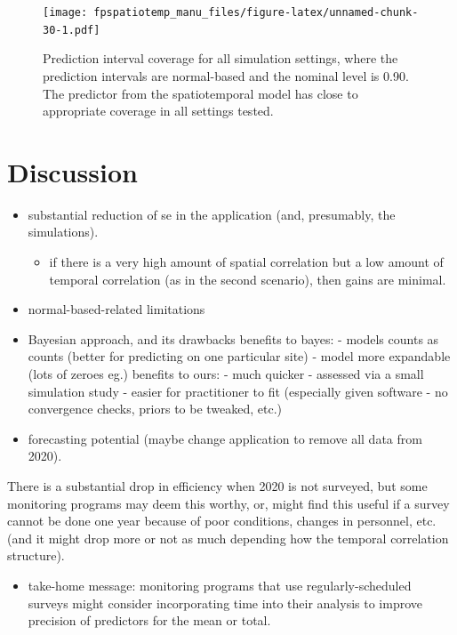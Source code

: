 \documentclass[]{interact}
\theoremstyle{plain}%
\theoremstyle{definition}
\theoremstyle{remark}
\providecommand{\tightlist}{%
  \setlength{\itemsep}{0pt}\setlength{\parskip}{0pt}}
\def\tightlist{}
\begin{document}
\begin{figure}
\centering
\texttt{[image: fpspatiotemp\_manu\_files/figure-latex/unnamed-chunk-30-1.pdf]}
\caption{\label{fig:pi} Prediction interval coverage for all simulation
settings, where the prediction intervals are normal-based and the
nominal level is 0.90. The predictor from the spatiotemporal model has
close to appropriate coverage in all settings tested.}
\end{figure}

\section{Discussion} \label{section:Discussion}

\begin{itemize}
\item
  substantial reduction of se in the application (and, presumably, the
  simulations).

  \begin{itemize}
  \tightlist
  \item
    if there is a very high amount of spatial correlation but a low
    amount of temporal correlation (as in the second scenario), then
    gains are minimal.
  \end{itemize}
\item
  normal-based-related limitations
\item
  Bayesian approach, and its drawbacks benefits to bayes: - models
  counts as counts (better for predicting on one particular site) -
  model more expandable (lots of zeroes eg.) benefits to ours: - much
  quicker - assessed via a small simulation study - easier for
  practitioner to fit (especially given software - no convergence
  checks, priors to be tweaked, etc.)
\item
  forecasting potential (maybe change application to remove all data
  from 2020).
\end{itemize}

There is a substantial drop in efficiency when 2020 is not surveyed, but
some monitoring programs may deem this worthy, or, might find this
useful if a survey cannot be done one year because of poor conditions,
changes in personnel, etc. (and it might drop more or not as much
depending how the temporal correlation structure).

\begin{itemize}
\tightlist
\item
  take-home message: monitoring programs that use regularly-scheduled
  surveys might consider incorporating time into their analysis to
  improve precision of predictors for the mean or total.
\end{itemize}
\end{document}
